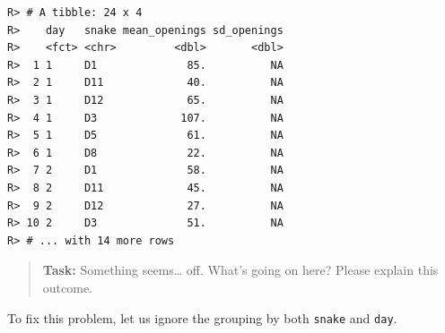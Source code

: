 \documentclass[english,10pt,a4paper,oneside]{book}
\newenvironment{Shaded}{\begin{snugshade}}{\end{snugshade}}
\newcommand{\KeywordTok}[1]{\textcolor[rgb]{0.13,0.29,0.53}{\textbf{#1}}}
\newcommand{\DataTypeTok}[1]{\textcolor[rgb]{0.13,0.29,0.53}{#1}}
\newcommand{\StringTok}[1]{\textcolor[rgb]{0.31,0.60,0.02}{#1}}
\newcommand{\OperatorTok}[1]{\textcolor[rgb]{0.81,0.36,0.00}{\textbf{#1}}}
\newcommand{\NormalTok}[1]{#1}
\theoremstyle{definition}
\theoremstyle{definition}
\theoremstyle{definition}
\theoremstyle{remark}
\begin{document}
\begin{Shaded}
\end{Shaded}

\begin{verbatim}
R> # A tibble: 24 x 4
R>    day   snake mean_openings sd_openings
R>    <fct> <chr>         <dbl>       <dbl>
R>  1 1     D1              85.          NA
R>  2 1     D11             40.          NA
R>  3 1     D12             65.          NA
R>  4 1     D3             107.          NA
R>  5 1     D5              61.          NA
R>  6 1     D8              22.          NA
R>  7 2     D1              58.          NA
R>  8 2     D11             45.          NA
R>  9 2     D12             27.          NA
R> 10 2     D3              51.          NA
R> # ... with 14 more rows
\end{verbatim}

\begin{quote}
\textbf{Task:} Something seems\ldots{} off. What's going on here? Please
explain this outcome.
\end{quote}

To fix this problem, let us ignore the grouping by both \texttt{snake}
and \texttt{day}.

\begin{Shaded}
\end{Shaded}
\end{document}
